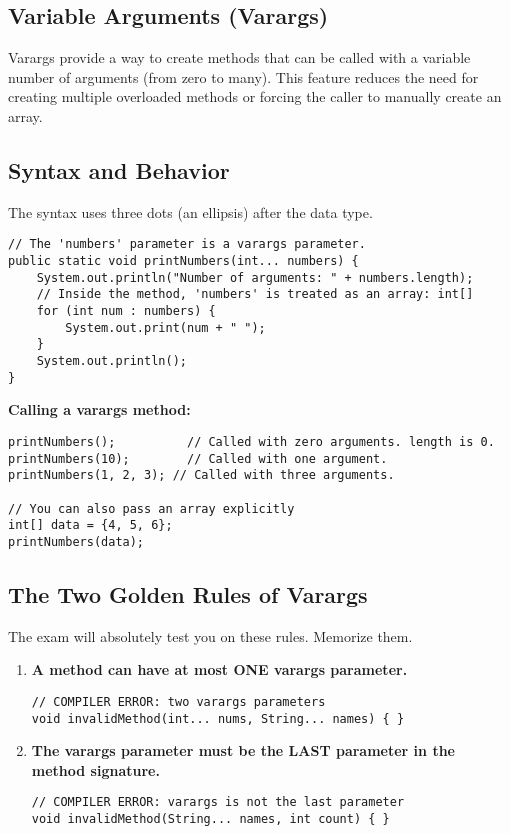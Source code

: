 \documentclass[12pt]{article}
\begin{document}
\begin{enumerate}[label=(\arabic*)]
\section{Variable Arguments (Varargs)}
Varargs provide a way to create methods that can be called with a variable number of arguments (from zero to many). This feature reduces the need for creating multiple overloaded methods or forcing the caller to manually create an array.

\subsection{Syntax and Behavior}
The syntax uses three dots (an ellipsis) after the data type.
\begin{verbatim}
// The 'numbers' parameter is a varargs parameter.
public static void printNumbers(int... numbers) {
    System.out.println("Number of arguments: " + numbers.length);
    // Inside the method, 'numbers' is treated as an array: int[]
    for (int num : numbers) {
        System.out.print(num + " ");
    }
    System.out.println();
}
\end{verbatim}
\textbf{Calling a varargs method:}
\begin{verbatim}
printNumbers();          // Called with zero arguments. length is 0.
printNumbers(10);        // Called with one argument.
printNumbers(1, 2, 3); // Called with three arguments.

// You can also pass an array explicitly
int[] data = {4, 5, 6};
printNumbers(data);
\end{verbatim}

\subsection{The Two Golden Rules of Varargs}
The exam will absolutely test you on these rules. Memorize them.

\begin{enumerate}
    \item \textbf{A method can have at most ONE varargs parameter.}
    \begin{verbatim}
// COMPILER ERROR: two varargs parameters
void invalidMethod(int... nums, String... names) { }
    \end{verbatim}

    \item \textbf{The varargs parameter must be the LAST parameter in the method signature.}
    \begin{verbatim}
// COMPILER ERROR: varargs is not the last parameter
void invalidMethod(String... names, int count) { }


\end{verbatim}
\end{enumerate}
\end{enumerate}
\end{document}
